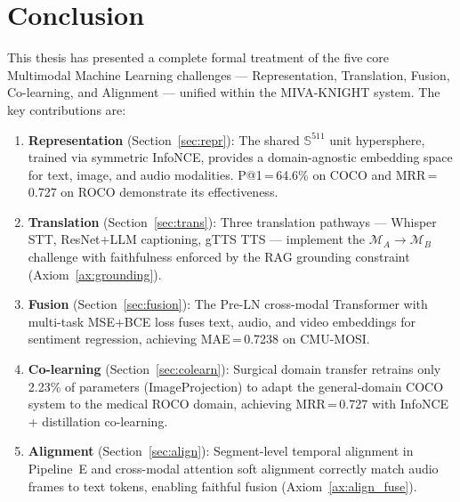 \documentclass[12pt,a4paper]{article}
\theoremstyle{definition}
\theoremstyle{plain}
\theoremstyle{remark}
\newcommand{\Sph}{\mathbb{S}}
\newcommand{\MA}{\mathcal{M}_A}
\newcommand{\MB}{\mathcal{M}_B}
\begin{document}
\section{Conclusion}

This thesis has presented a complete formal treatment of the five core Multimodal Machine Learning challenges — Representation, Translation, Fusion, Co-learning, and Alignment — unified within the MIVA-KNIGHT system. The key contributions are:

\begin{enumerate}
  \item \textbf{Representation} (Section~\ref{sec:repr}): The shared $\Sph^{511}$ unit hypersphere, trained via symmetric InfoNCE, provides a domain-agnostic embedding space for text, image, and audio modalities. P@1\,=\,64.6\% on COCO and MRR\,=\,0.727 on ROCO demonstrate its effectiveness.

  \item \textbf{Translation} (Section~\ref{sec:trans}): Three translation pathways — Whisper STT, ResNet+LLM captioning, gTTS TTS — implement the $\MA \to \MB$ challenge with faithfulness enforced by the RAG grounding constraint (Axiom~\ref{ax:grounding}).

  \item \textbf{Fusion} (Section~\ref{sec:fusion}): The Pre-LN cross-modal Transformer with multi-task MSE+BCE loss fuses text, audio, and video embeddings for sentiment regression, achieving MAE\,=\,0.7238 on CMU-MOSI.

  \item \textbf{Co-learning} (Section~\ref{sec:colearn}): Surgical domain transfer retrains only 2.23\% of parameters (ImageProjection) to adapt the general-domain COCO system to the medical ROCO domain, achieving MRR\,=\,0.727 with InfoNCE + distillation co-learning.

  \item \textbf{Alignment} (Section~\ref{sec:align}): Segment-level temporal alignment in Pipeline~E and cross-modal attention soft alignment correctly match audio frames to text tokens, enabling faithful fusion (Axiom~\ref{ax:align_fuse}).
\end{enumerate}
\end{document}

